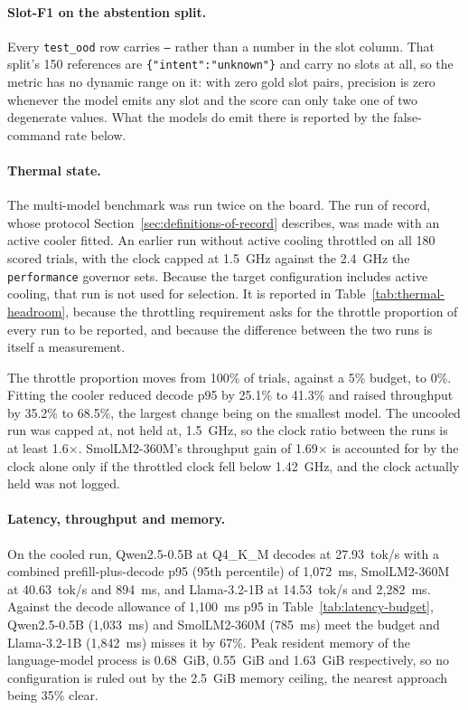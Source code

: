 \paragraph{Slot-F1 on the abstention split.} Every \texttt{test\_ood} row carries \texttt{--}
rather than a number in the slot column. That split's 150 references are
\texttt{\{"intent":"unknown"\}} and carry no slots at all, so the metric has no dynamic range on
it: with zero gold slot pairs, precision is zero whenever the model emits any slot and the score
can only take one of two degenerate values. What the models do emit there is reported by the
false-command rate below.

\paragraph{Thermal state.} The multi-model benchmark was run twice on the board. The run of
record, whose protocol Section~\ref{sec:definitions-of-record} describes, was made with an active
cooler fitted. An earlier run without active cooling throttled on all 180 scored trials, with the
clock capped at 1.5~GHz against the 2.4~GHz the \texttt{performance} governor sets. Because the
target configuration includes active cooling, that run is not used for selection. It is reported in
Table~\ref{tab:thermal-headroom}, because the throttling requirement asks for the throttle
proportion of every run to be reported, and because the difference between the two runs is itself a
measurement.



The throttle proportion moves from 100\% of trials, against a 5\% budget, to 0\%. Fitting the
cooler reduced decode p95 by 25.1\% to 41.3\% and raised throughput by 35.2\% to 68.5\%, the
largest change being on the smallest model. The uncooled run was capped at, not held at, 1.5~GHz,
so the clock ratio between the runs is at least 1.6$\times$. SmolLM2-360M's throughput gain of
1.69$\times$ is accounted for by the clock alone only if the throttled clock fell below 1.42~GHz,
and the clock actually held was not logged.

\paragraph{Latency, throughput and memory.} On the cooled run, Qwen2.5-0.5B at Q4\_K\_M decodes at
27.93~tok/s with a combined prefill-plus-decode p95 (95th percentile) of 1{,}072~ms, SmolLM2-360M
at 40.63~tok/s and 894~ms, and Llama-3.2-1B at 14.53~tok/s and 2{,}282~ms. Against the decode
allowance of 1{,}100~ms p95 in Table~\ref{tab:latency-budget}, Qwen2.5-0.5B (1{,}033~ms) and
SmolLM2-360M (785~ms) meet the budget and Llama-3.2-1B (1{,}842~ms) misses it by 67\%. Peak
resident memory of the language-model process is 0.68~GiB, 0.55~GiB and 1.63~GiB respectively, so
no configuration is ruled out by the 2.5~GiB memory ceiling, the nearest approach being 35\% clear.

